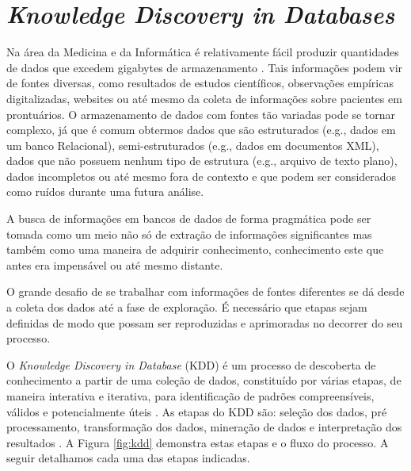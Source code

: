 \section{\emph{Knowledge Discovery in Databases}}

Na área da Medicina e da Informática é relativamente fácil produzir quantidades de dados que excedem gigabytes de armazenamento \cite{Holzinger2014}. Tais informações podem vir de fontes diversas, como resultados de estudos científicos, observações empíricas digitalizadas, websites ou até mesmo da coleta de informações sobre pacientes em prontuários. O armazenamento de dados com fontes tão variadas pode se tornar complexo, já que é comum obtermos dados que são estruturados (e.g., dados em um banco Relacional), semi-estruturados (e.g., dados em documentos XML), dados que não possuem nenhum tipo de estrutura (e.g., arquivo de texto plano), dados incompletos ou até mesmo fora de contexto e que podem ser considerados como ruídos durante uma futura análise.

A busca de informações em bancos de dados de forma pragmática pode ser tomada como um meio não só de extração de informações significantes mas também como uma maneira de adquirir conhecimento, conhecimento este que antes era impensável ou até mesmo distante.

O grande desafio de se trabalhar com informações de fontes diferentes se dá desde a coleta dos dados até a fase de exploração. É necessário que etapas sejam definidas de modo que possam ser reproduzidas e aprimoradas no decorrer do seu processo.

O \emph{Knowledge Discovery in Database} (KDD) é um processo de descoberta de conhecimento a partir de uma coleção de dados, constituído por várias etapas, de maneira interativa e iterativa, para identificação de padrões compreensíveis, válidos e potencialmente úteis \cite{Fayyad1996}. As etapas do KDD são: seleção dos dados, pré processamento, transformação dos dados, mineração de dados e interpretação dos resultados \cite{Holzinger2014, Fayyad1996}. A Figura \ref{fig:kdd} demonstra estas etapas e o fluxo do processo. A seguir detalhamos cada uma das etapas indicadas.

